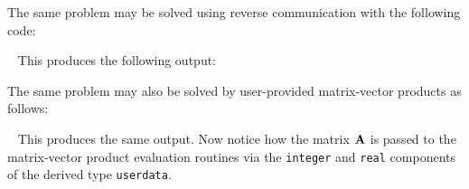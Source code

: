 \documentclass{galahad}
\begin{document}
The same problem may be solved using reverse communication with the
following code:

{\tt \small
\VerbatimInput{\packageexampleb}
}
\noindent
This produces the following output: \vspace*{-2mm}
{\tt \small
\VerbatimInput{\packageresultsb}
}
\noindent

The same problem may also be solved by user-provided matrix-vector
products as follows:

{\tt \small
\VerbatimInput{\packageexamplec}
}
\noindent
This produces the same output.
Now notice how the matrix ${\mathbf{A}}$ is passed to the matrix-vector product
evaluation routines via the {\tt integer} and
{\tt real} components of the derived type {\tt userdata}.

\end{document}
